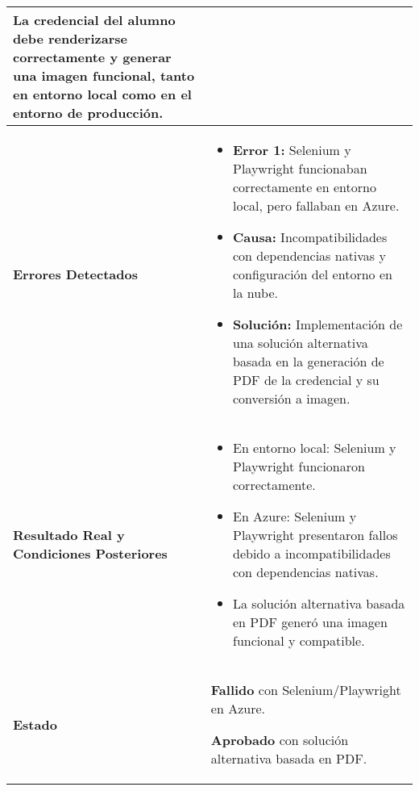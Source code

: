 \begin{longtable}{|p{5cm}|p{10cm}|}
	La credencial del alumno debe renderizarse correctamente y generar una imagen funcional, tanto en entorno local como en el entorno de producción. \\
	\hline
	\textbf{Errores Detectados} &
	\begin{itemize}
		\item \textbf{Error 1:} Selenium y Playwright funcionaban correctamente en entorno local, pero fallaban en Azure.
		\item \textbf{Causa:} Incompatibilidades con dependencias nativas y configuración del entorno en la nube.
		\item \textbf{Solución:} Implementación de una solución alternativa basada en la generación de PDF de la credencial y su conversión a imagen.
	\end{itemize} \\
	\hline
	\textbf{Resultado Real y Condiciones Posteriores} & 
	\begin{itemize}
		\item En entorno local: Selenium y Playwright funcionaron correctamente.
		\item En Azure: Selenium y Playwright presentaron fallos debido a incompatibilidades con dependencias nativas.
		\item La solución alternativa basada en PDF generó una imagen funcional y compatible.
	\end{itemize} \\
	\hline
	\textbf{Estado} & 
	\textbf{Fallido} con Selenium/Playwright en Azure.  
	
	\textbf{Aprobado} con solución alternativa basada en PDF. \\
	\hline
\end{longtable}
